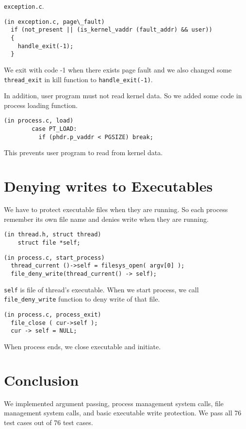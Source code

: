 \documentclass[a4paper,article,11pt,oneside]{article}
\begin{document}
\texttt{exception.c}.

\begin{verbatim}
(in exception.c, page\_fault)
  if (not_present || (is_kernel_vaddr (fault_addr) && user))
  {
    handle_exit(-1);
  }
\end{verbatim}

We exit with code -1 when there exists page fault and we also changed some \texttt{thread\_exit} in kill function to \texttt{handle\_exit(-1)}.

In addition, user program must not read kernel data. So we added some code in process loading function.

\begin{verbatim}
(in process.c, load)
        case PT_LOAD:
          if (phdr.p_vaddr < PGSIZE) break;
\end{verbatim}

This prevents user program to read from kernel data.

\section{Denying writes to Executables}\label{secdeny}
We have to protect executable files when they are running. So each process remember its own file name and denies write when they are running.

\begin{verbatim}
(in thread.h, struct thread)
    struct file *self;
\end{verbatim}

\begin{verbatim}
(in process.c, start_process)
  thread_current ()->self = filesys_open( argv[0] );
  file_deny_write(thread_current() -> self);
\end{verbatim}

\texttt{self} is file of thread's executable. When we start process, we call \texttt{file\_deny\_write} function to deny write of that file.

\begin{verbatim}
(in process.c, process_exit)
  file_close ( cur->self );
  cur -> self = NULL;
\end{verbatim}

When process ends, we close executable and initiate.

\section{Conclusion}\label{secconclusion}
We implemented argument passing, process management system calls, file
management system calls, and basic executable write protection. We
pass all 76 test cases out of 76 test cases.
\end{document}
